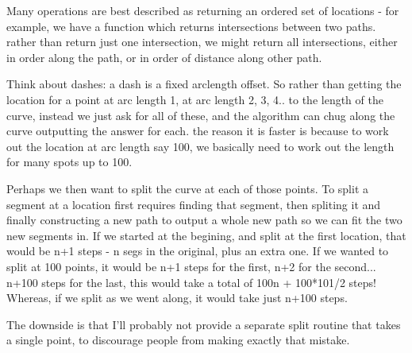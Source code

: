 \documentclass{book}
\begin{document}
Many operations are best described as returning an ordered set of
locations - for example, we have a function which returns
intersections between two paths.  rather than return just one
intersection, we might return all intersections, either in order along
the path, or in order of distance along other path.

Think about dashes: a dash is a fixed arclength offset.  So rather
than getting the location for a point at arc length 1, at arc length
2, 3, 4.. to the length of the curve, instead we just ask for all of
these, and the algorithm can chug along the curve outputting the
answer for each.  the reason it is faster is because to work out the
location at arc length say 100, we basically need to work out the
length for many spots up to 100.

Perhaps we then want to split the curve at each of those points.  To
split a segment at a location first requires finding that segment,
then spliting it and finally constructing a new path to output a whole
new path so we can fit the two new segments in.  If we started at the
begining, and split at the first location, that would be n+1 steps - n
segs in the original, plus an extra one.  If we wanted to split at 100
points, it would be n+1 steps for the first, n+2 for the
second... n+100 steps for the last, this would take a total of 100n +
100*101/2 steps!  Whereas, if we split as we went along, it would take
just n+100 steps.

The downside is that I'll probably not provide a separate split
routine that takes a single point, to discourage people from making
exactly that mistake.
\end{document}

